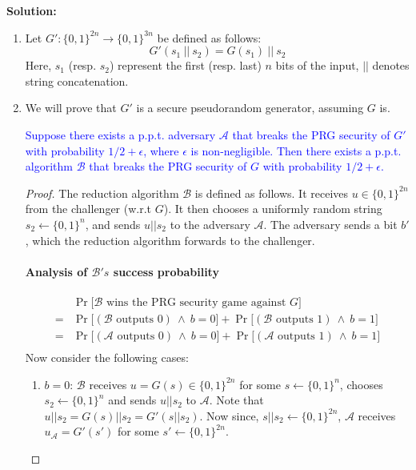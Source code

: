 \documentclass[10pt,addpoints]{exam}
\newcommand{\prob}[1]{\Pr\Big[ #1 \Big]}
\newcommand{\calA}{\mathcal{A}}
\newcommand{\calB}{\mathcal{B}}
\theoremstyle{definition}
\newenvironment{customclaim}[1]
  {\renewcommand\theinnercustomclaim{\textcolor{blue}{#1}}\innercustomclaim}
  {\endinnercustomclaim}
\begin{document}
\textbf{Solution: }
\begin{enumerate}
    \item 
    Let $G' : \{0,1\}^{2n} \to \{0,1\}^{3n}$ be defined as follows: 
    \[
        G'(s_1 ~||~ s_2) = G(s_1) ~||~ s_2
    \]
    Here, $s_1$ (resp. $s_2$) represent the first (resp. last) $n$ bits of the input, $||$ denotes string concatenation. 


    \item We will prove that $G'$ is a secure pseudorandom generator, assuming $G$ is. 

    \begin{customclaim}{1}
        \textcolor{blue}{Suppose there exists a p.p.t. adversary $\calA$ that breaks the PRG security of $G'$ with probability $1/2 + \epsilon$, where $\epsilon$ is non-negligible. Then there exists a p.p.t. algorithm $\calB$ that breaks the PRG security of $G$ with probability $1/2 + \epsilon$. }
    \end{customclaim}

    \begin{proof}
        The reduction algorithm $\calB$ is defined as follows. It receives $u \in \{0,1\}^{2n}$ from the challenger (w.r.t $G$). It then chooses a uniformly random string $s_2 \gets \{0,1\}^n$, and sends $u || s_2$ to the adversary $\calA$. The adversary sends a bit $b'$, which the reduction algorithm forwards to the challenger. 

        \vspace{5pt}

        \paragraph{Analysis of $\calB's$ success probability}

        \begin{align*}
            & \prob{\calB \text{ wins the PRG security game against }G} \\
            = & \prob{\left(\calB \text{ outputs }0\right) ~     \wedge ~ b=0} +  
                \prob{\left(\calB \text{ outputs }1\right) ~ \wedge ~ b=1} \\
            = & \prob{\left(\calA \text{ outputs }0\right) ~     \wedge ~ b=0} +  
                \prob{\left(\calA \text{ outputs }1\right) ~ \wedge ~ b=1} \\
        \end{align*}
    Now consider the following cases:
        \begin{enumerate}
            \item $b = 0$: $\calB$ receives $u = G(s) \in \{0,1\}^{2n}$ for some $s \gets \{0,1\}^n$, chooses $s_2 \gets \{0,1\}^n$ and sends $u||s_2$ to $\calA$. Note that $u||s_2 = G(s)||s_2 = G'(s||s_2)$. Now since, $s||s_2 \gets \{0,1\}^{2n}$, $\calA$ receives $u_{\calA} = G'(s')$ for some $s' \gets \{0,1\}^{2n}$.
            

\end{enumerate}
\end{proof}
\end{enumerate}
\end{document}

